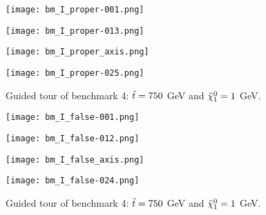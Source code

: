 \begin{figure}[htbp]
\centering
  \begin{minipage}[htbp]{0.49\textwidth}
    \centering
    \texttt{[image: bm\_I\_proper-001.png]}
  \end{minipage}
  \begin{minipage}[htbp]{0.49\textwidth}
    \centering
    \texttt{[image: bm\_I\_proper-013.png]}
  \end{minipage}
  \begin{minipage}[htbp]{0.49\textwidth}
    \centering
    \texttt{[image: bm\_I\_proper\_axis.png]}
  \end{minipage}
  \begin{minipage}[htbp]{0.49\textwidth}
    \centering
    \texttt{[image: bm\_I\_proper-025.png]}
  \end{minipage}
  \caption{Guided tour of benchmark 4: $\Tilde{t} = 750$ GeV and $\Tilde{\chi}_1^0 = 1$ GeV. }
  \label{fig:bmIn_tour}
\end{figure}

\begin{figure}[htbp]
\centering
  \begin{minipage}[htbp]{0.49\textwidth}
    \centering
    \texttt{[image: bm\_I\_false-001.png]}
  \end{minipage}
  \begin{minipage}[htbp]{0.49\textwidth}
    \centering
    \texttt{[image: bm\_I\_false-012.png]}
  \end{minipage}
  \begin{minipage}[htbp]{0.49\textwidth}
    \centering
    \texttt{[image: bm\_I\_false\_axis.png]}
  \end{minipage}
  \begin{minipage}[htbp]{0.49\textwidth}
    \centering
    \texttt{[image: bm\_I\_false-024.png]}
  \end{minipage}
  \caption{Guided tour of benchmark 4: $\Tilde{t} = 750$ GeV and $\Tilde{\chi}_1^0 = 1$ GeV. }
  \label{fig:bmInF_tour}
\end{figure}



